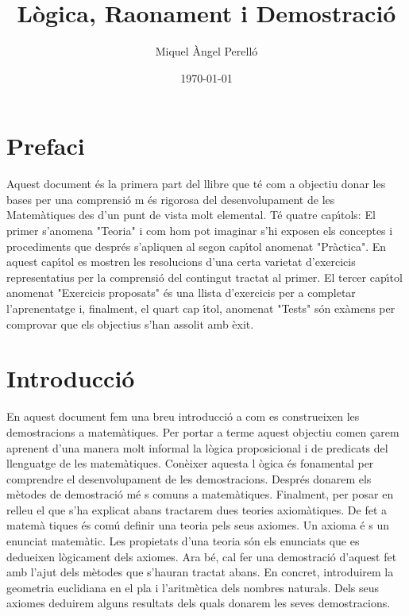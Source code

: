 \documentclass[a4paper,12pt]{book}
\begin{document}
\pagecolor{fons!20}
\title{{\color{apren}\textbf{\huge{Lògica, Raonament i Demostració}}}}
\author{Miquel Àngel Perelló}
\date{\today}

\let\cleardoublepage\clearpage
\maketitle
\tableofcontents
\frontmatter

\let\cleardoublepage\clearpage

\chapter*{Prefaci}

Aquest document \'{e}s la primera part del
llibre que t\'{e} com a objectiu donar les bases per una comprensi\'{o} m%
\'{e}s rigorosa del desenvolupament de les Matem\`{a}tiques des d'un punt de
vista molt elemental. T\'{e} quatre cap\'{\i}tols: El primer s'anomena
"Teoria" i com hom pot imaginar s'hi exposen els conceptes i procediments
que despr\'{e}s s'apliquen al segon cap\'{\i}tol anomenat "Pr\`{a}ctica". En
aquest cap\'{\i}tol es mostren les resolucions d'una certa varietat
d'exercicis representatius per la comprensi\'{o} del contingut tractat al
primer. El tercer cap\'{\i}tol anomenat "Exercicis proposats" \'{e}s una
llista d'exercicis per a completar l'aprenentatge i, finalment, el quart cap%
\'{\i}tol, anomenat "Tests" s\'{o}n ex\`{a}mens per comprovar que els
objectius s'han assolit amb \`{e}xit.

\let\cleardoublepage\clearpage

\chapter{Introducci\'{o}}

En aquest document fem una breu introducci\'{o} a com es construeixen les
demostracions a matem\`{a}tiques. Per portar a terme aquest objectiu comen%
\c{c}arem aprenent d'una manera molt informal la l\`{o}gica proposicional i
de predicats del llenguatge de les matem\`{a}tiques. Con\`{e}ixer aquesta l%
\`{o}gica \'{e}s fonamental per comprendre el desenvolupament de les
demostracions. Despr\'{e}s donarem els m\`{e}todes de demostraci\'{o} m\'{e}%
s comuns a matem\`{a}tiques. Finalment, per posar en relleu el que s'ha
explicat abans tractarem dues teories axiom\`{a}tiques. De fet a matem\`{a}%
tiques \'{e}s com\'{u} definir una teoria pels seus axiomes. Un axioma \'{e}%
s un enunciat matem\`{a}tic. Les propietats d'una teoria s\'{o}n els
enunciats que es dedueixen l\`{o}gicament dels axiomes. Ara b\'{e}, cal fer
una demostraci\'{o} d'aquest fet amb l'ajut dels m\`{e}todes que s'hauran
tractat abans. En concret, introduirem la geometria euclidiana en el pla i
l'aritm\`{e}tica dels nombres naturals. Dels seus axiomes deduirem alguns
resultats dels quals donarem les seves demostracions.
\end{document}

